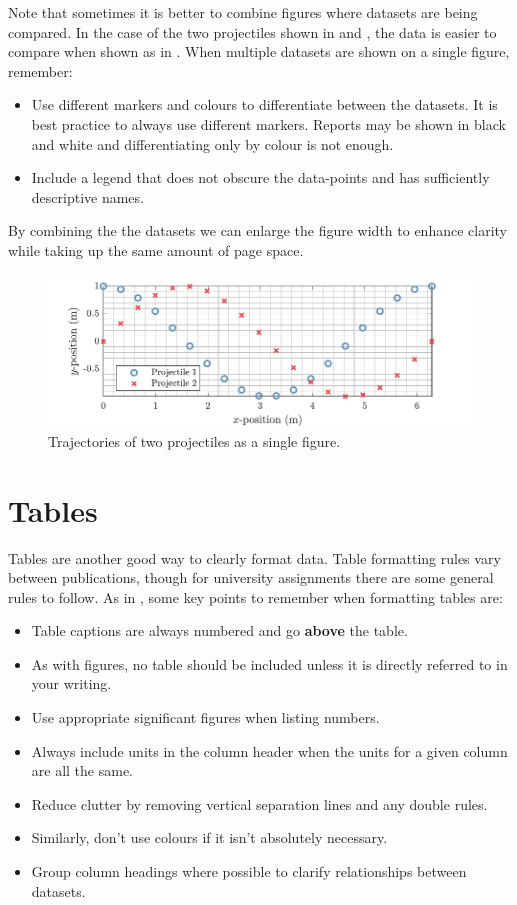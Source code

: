 \documentclass[draft,article]{UsydReport}
\begin{document}
Note that sometimes it is better to combine figures where datasets are being compared. In the case of the two projectiles shown in  and , the data is easier to compare when shown as in . When multiple datasets are shown on a single figure, remember:
\begin{itemize}
    \item Use different markers and colours to differentiate between the datasets. It is best practice to always use different markers. Reports may be shown in black and white and differentiating only by colour is not enough.
    \item Include a legend that does not obscure the data-points and has sufficiently descriptive names.
\end{itemize}
By combining the the datasets we can enlarge the figure width to enhance clarity while taking up the same amount of page space.

\begin{figure}
    \centering
    \includegraphics{Images/Both.pdf}
    \caption{Trajectories of two projectiles as a single figure.}
    \label{fig:OneFig}
\end{figure}

\section{Tables}
Tables are another good way to clearly format data. Table formatting rules vary between publications, though for university assignments there are some general rules to follow. As in , some key points to remember when formatting tables are:
\begin{itemize}
    \item Table captions are always numbered and go \textbf{above} the table.
    \item As with figures, no table should be included unless it is directly referred to in your writing.
    \item Use appropriate significant figures when listing numbers.
    \item Always include units in the column header when the units for a given column are all the same.
    \item Reduce clutter by removing vertical separation lines and any double rules.
    \item Similarly, don't use colours if it isn't absolutely necessary.
    \item Group column headings where possible to clarify relationships between datasets.
\end{itemize}
\end{document}
